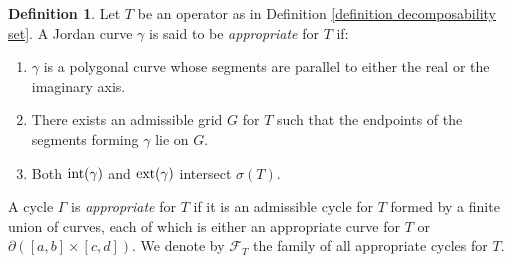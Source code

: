 \documentclass[11pt]{amsart}
\theoremstyle{definition}
\newtheorem{definition}[theorem]{Definition}
\theoremstyle{remark}
\numberwithin{equation}{section}
\newcommand{\inte}{\textnormal{int}}
\newcommand{\exte}{\textnormal{ext}}
\begin{document}
\begin{definition}
Let $T$ be an operator as in Definition \ref{definition decomposability set}. A Jordan curve $\gamma$ is said to be \textit{appropriate} for $T$ if:
\begin{enumerate}
    \item[(i)] $\gamma$ is a polygonal curve whose segments are parallel to either the real or the imaginary axis.
    \item[(ii)] There exists an admissible grid $G$ for $T$ such that the endpoints of the segments forming $\gamma$ lie on $G$.
    \item[(iii)] Both $\inte(\gamma)$ and $\exte(\gamma)$ intersect $\sigma(T)$.
\end{enumerate}
A cycle $\Gamma$ is \textit{appropriate} for $T$ if it is an admissible cycle for $T$ formed by a finite union of curves, each of which is either an appropriate curve for $T$ or $\partial([a,b]\times[c,d])$. We denote by $\mathcal{F}_T$ the family of all appropriate cycles for $T$.\end{definition}
\end{document}

